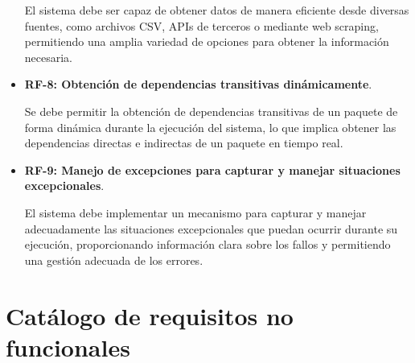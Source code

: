 \begin{itemize}
	      El sistema debe ser capaz de obtener datos de manera eficiente desde diversas fuentes, como archivos CSV, APIs de terceros o mediante web scraping, permitiendo una amplia variedad de opciones para obtener la información necesaria.

	\item \textbf{RF-8: Obtención de dependencias transitivas dinámicamente}.

	      Se debe permitir la obtención de dependencias transitivas de un paquete de forma dinámica durante la ejecución del sistema, lo que implica obtener las dependencias directas e indirectas de un paquete en tiempo real.

	\item \textbf{RF-9: Manejo de excepciones para capturar y manejar situaciones excepcionales}.

	      El sistema debe implementar un mecanismo para capturar y manejar adecuadamente las situaciones excepcionales que puedan ocurrir durante su ejecución, proporcionando información clara sobre los fallos y permitiendo una gestión adecuada de los errores.
\end{itemize}

\section{Catálogo de requisitos no funcionales}

